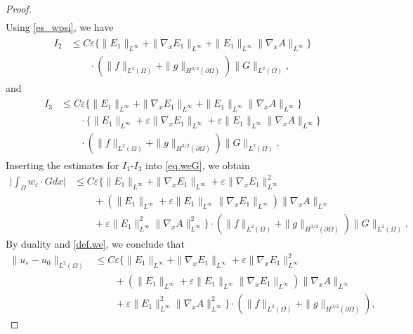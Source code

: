 \documentclass[reqno,12pt]{amsart} %
\theoremstyle{definition}
\theoremstyle{remark}
\numberwithin{equation}{section}
\begin{document}
\begin{proof}
\begin{align}
\end{align}
Using \eqref{es_wpsi}, we have
\begin{align}\label{est.I2}
\begin{aligned}
  I_2 & \le C \varepsilon\big\{\|E_1\|_{L^\infty}+\|\nabla_xE_1\|_{L^\infty}+\|E_1\|_{L^\infty}\|\nabla_xA\|_{L^\infty}\big\}\\
  & \qquad \cdot (\|f\|_{L^2(\Omega)}+\|g\|_{H^{3/2}(\partial \Omega)}) \| G \|_{L^2(\Omega)},
  \end{aligned}
\end{align}
and
\begin{align}\label{est.I3}
\begin{aligned}
  I_3 & \le C \varepsilon\big\{ \|E_1\|_{L^\infty}+\|\nabla_xE_1\|_{L^\infty} + \|E_1\|_{L^\infty}\|\nabla_xA\|_{L^\infty}\big\} \\
  & \qquad \cdot \big\{ \|E_1\|_{L^\infty} + \varepsilon\|\nabla_xE_1\|_{L^\infty} + \varepsilon\|E_1\|_{L^\infty}\|\nabla_xA\|_{L^\infty}\big\} \\
  & \qquad \cdot (\|f\|_{L^2(\Omega)}+\|g\|_{H^{3/2}(\partial \Omega)}) \| G \|_{L^2(\Omega)}.
  \end{aligned}
\end{align}
Inserting the estimates for $I_1$-$I_3$ into \eqref{eq.weG}, we obtain 
\begin{equation*}
\begin{aligned}
    \bigg|\int_\Omega w_\varepsilon\cdot G dx\bigg| & \le C\varepsilon \Big\{ \|E_1\|_{L^\infty}+\|\nabla_xE_1\|_{L^\infty}+\varepsilon\|\nabla_xE_1\|_{L^\infty}^2 \\
    & \qquad + (\|E_1\|_{L^\infty}+\varepsilon\|E_1\|_{L^\infty}\|\nabla_xE_1\|_{L^\infty})\|\nabla_xA\|_{L^\infty}\\
    & \qquad + \varepsilon \|E_1\|_{L^\infty}^2\|\nabla_xA\|_{L^\infty}^2\Big\} \cdot (\|f\|_{L^2(\Omega)}+\|g\|_{H^{3/2}(\partial\Omega)}) \| G \|_{L^2(\Omega)}.
  \end{aligned}
\end{equation*}
By duality and \eqref{def.we}, we conclude  that
\begin{align*}
  \|u_\varepsilon-u_0\|_{L^2(\Omega)}& \le C\varepsilon \Big\{ \|E_1\|_{L^\infty}+\|\nabla_xE_1\|_{L^\infty}+\varepsilon\|\nabla_xE_1\|_{L^\infty}^2 \\
    & \qquad + (\|E_1\|_{L^\infty}+\varepsilon\|E_1\|_{L^\infty}\|\nabla_xE_1\|_{L^\infty})\|\nabla_xA\|_{L^\infty}\\
    & \qquad + \varepsilon \|E_1\|_{L^\infty}^2\|\nabla_xA\|_{L^\infty}^2\Big\} \cdot (\|f\|_{L^2(\Omega)}+\|g\|_{H^{3/2}(\partial\Omega)}),

\end{align*}
\end{proof}
\end{document}
